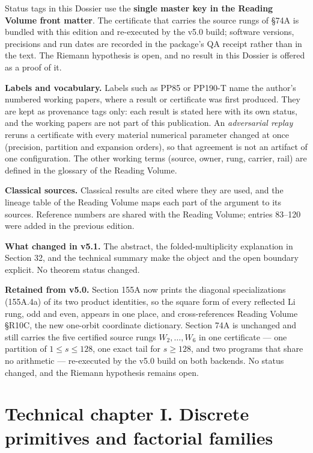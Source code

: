 \documentclass[
  11pt,
]{book}
\begin{document}
Status tags in this Dossier use the \textbf{single master key in the
Reading Volume front matter}. The certificate that carries the source
rungs of §74A is bundled with this edition and re-executed by the v5.0
build; software versions, precisions and run dates are recorded in the
package's QA receipt rather than in the text. The Riemann hypothesis is
open, and no result in this Dossier is offered as a proof of it.

\textbf{Labels and vocabulary.} Labels such as PP85 or PP190-T name the
author's numbered working papers, where a result or certificate was
first produced. They are kept as provenance tags only: each result is
stated here with its own status, and the working papers are not part of
this publication. An \emph{adversarial replay} reruns a certificate with
every material numerical parameter changed at once (precision, partition
and expansion orders), so that agreement is not an artifact of one
configuration. The other working terms (source, owner, rung, carrier,
rail) are defined in the glossary of the Reading Volume.

\textbf{Classical sources.} Classical results are cited where they are
used, and the lineage table of the Reading Volume maps each part of the
argument to its sources. Reference numbers are shared with the Reading
Volume; entries 83--120 were added in the previous edition.

\textbf{What changed in v5.1.} The abstract, the folded-multiplicity
explanation in Section 32, and the technical summary make the object and
the open boundary explicit. No theorem status changed.

\textbf{Retained from v5.0.} Section 155A now prints the diagonal
specializations (155A.4a) of its two product identities, so the square
form of every reflected Li rung, odd and even, appears in one place, and
cross-references Reading Volume §R10C, the new one-orbit coordinate
dictionary. Section 74A is unchanged and still carries the five
certified source rungs \(W_2,\ldots,W_6\) in one certificate --- one
partition of \(1\le s\le128\), one exact tail for \(s\ge128\), and two
programs that share no arithmetic --- re-executed by the v5.0 build on
both backends. No status changed, and the Riemann hypothesis remains
open.

\newpage

\chapter{Technical chapter I. Discrete primitives and factorial
families}\label{technical-chapter-i.-discrete-primitives-and-factorial-families}
\end{document}

